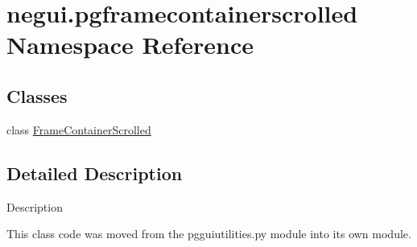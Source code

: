 \hypertarget{namespacenegui_1_1pgframecontainerscrolled}{}\section{negui.\+pgframecontainerscrolled Namespace Reference}
\label{namespacenegui_1_1pgframecontainerscrolled}
\subsection*{Classes}
\begin{DoxyCompactItemize}
\item 
class \hyperlink{classnegui_1_1pgframecontainerscrolled_1_1FrameContainerScrolled}{Frame\+Container\+Scrolled}
\end{DoxyCompactItemize}


\subsection{Detailed Description}
\begin{DoxyVerb}Description 

This class code was moved from
the pgguiutilities.py module into its own
module.
\end{DoxyVerb}
 